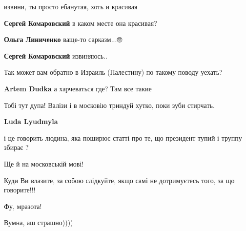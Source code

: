 \begin{itemize}
извини, ты просто ебанутая, хоть и красивая

\begin{itemize}

\textbf{Сергей Комаровский} в каком месте она красивая?


\textbf{Ольга Линиченко} ваще-то сарказм...🤓


\textbf{Сергей Комаровский} извиняюсь..
\end{itemize}


Так может вам обратно в Израиль (Палестину) по такому поводу уехать?

\begin{itemize}

\textbf{Artem Dudka} а харчеваться где? Там все такие
\end{itemize}


Тобі тут дупа! Валізи і в московію триндуй хутко, поки зуби стирчать.

\begin{itemize}

\textbf{Luda Lyudmyla} 

і це говорить людина, яка поширює статті про те, що президент тупий і труппу
збирає ?

Ще й на московській мові!

Куди Ви влазите, за собою слідкуйте, якщо самі не дотримуєтесь того, за що
говорите!!!

\end{itemize}


Фу, мразота!


Вумна, аш страшно))))

\end{itemize}

